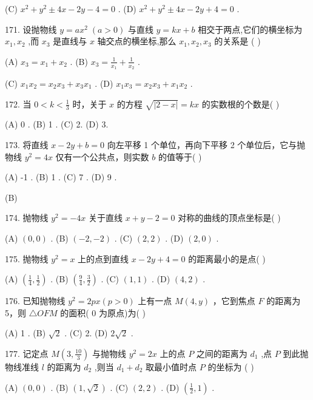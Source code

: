 \documentclass[10pt]{article}
\begin{document}
(C) \({x}^{2} + {y}^{2} \pm  {4x} - {2y} - 4 = 0\) . (D) \({x}^{2} + {y}^{2} \pm  {4x} - {2y} + 4 = 0\) .

171. 设抛物线 \(y = a{x}^{2}\;\left( {a > 0}\right)\) 与直线 \(y = {kx} + b\) 相交于两点,它们的横坐标为 \({x}_{1},{x}_{2}\) ,而 \({x}_{3}\) 是直线与 \(x\) 轴交点的横坐标,那么 \({x}_{1},{x}_{2},{x}_{3}\) 的关系是 ( )

(A) \({x}_{3} = {x}_{1} + {x}_{2}\) . (B) \({x}_{3} = \frac{1}{{x}_{1}} + \frac{1}{{x}_{2}}\) .

(C) \({x}_{1}{x}_{2} = {x}_{2}{x}_{3} + {x}_{3}{x}_{1}\) . (D) \({x}_{1}{x}_{3} = {x}_{2}{x}_{3} + {x}_{1}{x}_{2}\) .

172. 当 \(0 < k < \frac{1}{3}\) 时，关于 \(x\) 的方程 \(\sqrt{\left| 2 - x\right| } = {kx}\) 的实数根的个数是( )

(A) 0 . (B) 1 . (C) 2. (D) 3.

173. 将直线 \(x - {2y} + b = 0\) 向左平移 1 个单位，再向下平移 2 个单位后，它与抛物线 \({y}^{2} = {4x}\) 仅有一个公共点，则实数 \(b\) 的值等于( )

(A) -1 . (B) 1 . (C) 7 . (D) 9 .

(B)

174. 抛物线 \({y}^{2} =  - {4x}\) 关于直线 \(x + y - 2 = 0\) 对称的曲线的顶点坐标是( )

(A) \(\left( {0,0}\right)\) . (B) \(\left( {-2, - 2}\right)\) . (C) \(\left( {2,2}\right)\) . (D) \(\left( {2,0}\right)\) .

175. 抛物线 \({y}^{2} = x\) 上的点到直线 \(x - {2y} + 4 = 0\) 的距离最小的是点(   )

(A) \(\left( {\frac{1}{4},\frac{1}{2}}\right)\) . (B) \(\left( {\frac{9}{4},\frac{3}{2}}\right)\) . (C) \(\left( {1,1}\right)\) . (D) \(\left( {4,2}\right)\) .

176. 已知抛物线 \({y}^{2} = {2px}\left( {p > 0}\right)\) 上有一点 \(M\left( {4,y}\right)\) ，它到焦点 \(F\) 的距离为 5，则 \(\bigtriangleup  {OFM}\) 的面积( 0 为原点)为( )

(A) 1 . (B) \(\sqrt{2}\) . (C) 2. (D) \(2\sqrt{2}\) .

177. 记定点 \(M\left( {3,\frac{10}{3}}\right)\) 与抛物线 \({y}^{2} = {2x}\) 上的点 \(P\) 之间的距离为 \({d}_{1}\) ,点 \(P\) 到此抛物线准线 \(l\) 的距离为 \({d}_{2}\) ,则当 \({d}_{1} + {d}_{2}\) 取最小值时点 \(P\) 的坐标为 ( )

(A) \(\left( {0,0}\right)\) . (B) \(\left( {1,\sqrt{2}}\right)\) . (C) \(\left( {2,2}\right)\) . (D) \(\left( {\frac{1}{2},1}\right)\) .
\end{document}
